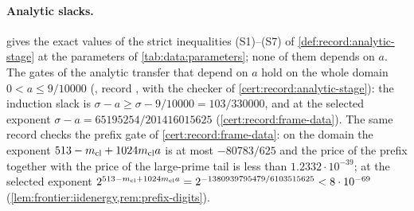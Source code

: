 \paragraph{Analytic slacks.}
 gives the exact values of the strict inequalities
(S1)--(S7) of \cref{def:record:analytic-stage} at the parameters of
\cref{tab:data:parameters}; none of them depends on $a$. The gates of the
analytic transfer that depend on $a$ hold on the whole domain $0<a\le9/10000$
(, record
, with the checker of \cref{cert:record:analytic-stage}):
the induction slack is $\sigma-a\ge\sigma-9/10000=103/330000$, and at the
selected exponent $\sigma-a=65195254/201416015625$
(\cref{cert:record:frame-data}). The same record checks the prefix gate of
\cref{cert:record:frame-data}: on the domain the exponent
$513-m_{\mathrm{cl}}+1024m_{\mathrm{cl}} a$ is at most $-80783/625$ and the price of the
prefix together with the price of the large-prime tail is less
than $1.2332\cdot10^{-39}$; at the selected exponent
$2^{513-m_{\mathrm{cl}}+1024m_{\mathrm{cl}} a}=2^{-1380939795479/6103515625}<8\cdot10^{-69}$
(\cref{lem:frontier:iidenergy,rem:prefix-digits}).

